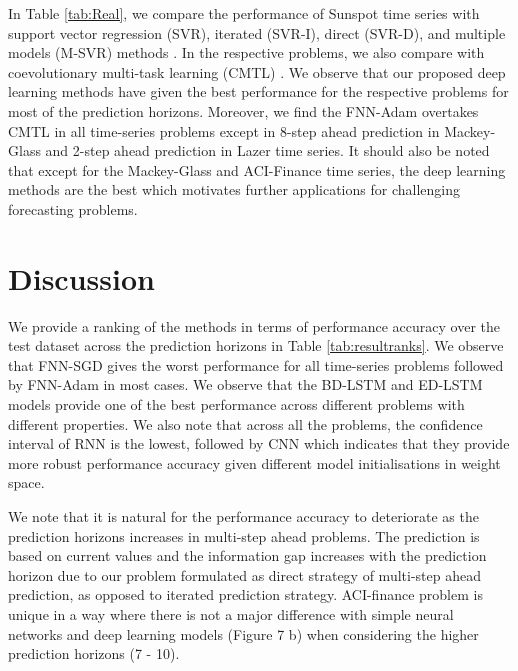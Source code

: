 \documentclass{ieeeaccess}
\begin{document}
In Table  \ref{tab:Real}, we compare the performance of Sunspot  time series  with support vector 
regression (SVR),  iterated (SVR-I), direct (SVR-D), and  multiple models
(M-SVR) methods \cite{zhang2013iterated}. In the respective problems, we also compare with   coevolutionary multi-task learning (CMTL) \cite{chandra2017CMTLMulti}.   We observe that  our proposed deep learning methods have given the best performance for the respective problems for most of the prediction horizons. Moreover, we find  the FNN-Adam overtakes  CMTL in all time-series problems except in 8-step ahead prediction in Mackey-Glass and 2-step ahead prediction in Lazer time series. It should also be noted that except for the Mackey-Glass and ACI-Finance time series, the deep learning methods are the best  which motivates   further applications   for challenging forecasting problems. 
 
 
 \section{Discussion}
 
 

We provide a ranking of the methods in terms of performance accuracy over the test dataset across the prediction horizons in Table \ref{tab:resultranks}. We observe that FNN-SGD gives the worst performance for all time-series problems followed by FNN-Adam in most cases.   We observe that the BD-LSTM and ED-LSTM models provide one of the best performance across different problems with different properties. We also note that   across all the problems, the confidence interval of RNN is the lowest, followed by CNN which indicates that they provide more robust performance accuracy given different model initialisations in weight space.
 
  We note that it is natural for the performance accuracy  to deteriorate as the prediction horizons increases in multi-step ahead problems. The prediction is based on current values and the information gap   increases with  the prediction horizon due to our problem formulated as direct strategy of multi-step ahead prediction, as opposed to iterated prediction strategy. ACI-finance problem is  unique in  a way where there is not a major difference with simple neural networks and deep learning models (Figure 7 b) when considering the higher prediction horizons (7 - 10). 
  
\end{document}
